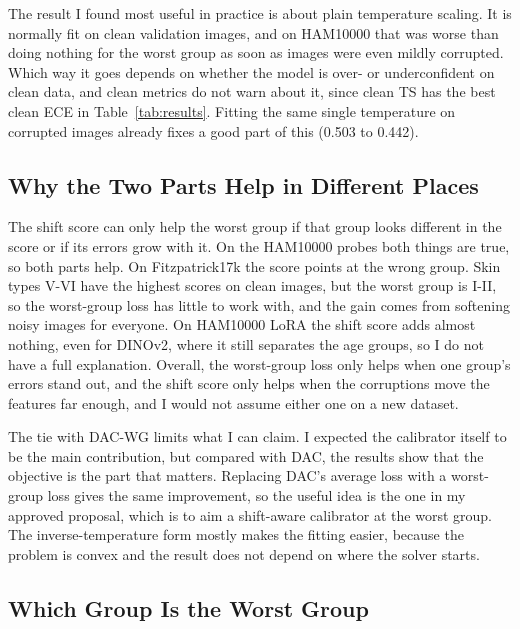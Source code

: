 \documentclass[sigconf,nonacm]{acmart}
\begin{document}
The result I found most useful in practice is about plain temperature scaling. It is normally fit on clean validation images, and on HAM10000 that was worse than doing nothing for the worst group as soon as images were even mildly corrupted. Which way it goes depends on whether the model is over- or underconfident on clean data, and clean metrics do not warn about it, since clean TS has the best clean ECE in Table~\ref{tab:results}. Fitting the same single temperature on corrupted images already fixes a good part of this (0.503 to 0.442).

\subsection{Why the Two Parts Help in Different Places}

The shift score can only help the worst group if that group looks different in the score or if its errors grow with it. On the HAM10000 probes both things are true, so both parts help. On Fitzpatrick17k the score points at the wrong group. Skin types V-VI have the highest scores on clean images, but the worst group is I-II, so the worst-group loss has little to work with, and the gain comes from softening noisy images for everyone. On HAM10000 LoRA the shift score adds almost nothing, even for DINOv2, where it still separates the age groups, so I do not have a full explanation. Overall, the worst-group loss only helps when one group's errors stand out, and the shift score only helps when the corruptions move the features far enough, and I would not assume either one on a new dataset.

The tie with DAC-WG limits what I can claim. I expected the calibrator itself to be the main contribution, but compared with DAC, the results show that the objective is the part that matters. Replacing DAC's average loss with a worst-group loss gives the same improvement, so the useful idea is the one in my approved proposal, which is to aim a shift-aware calibrator at the worst group. The inverse-temperature form mostly makes the fitting easier, because the problem is convex and the result does not depend on where the solver starts.

\subsection{Which Group Is the Worst Group}
\end{document}
